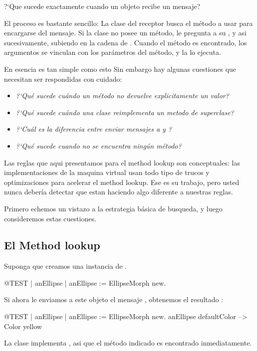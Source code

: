 \documentclass[a4paper,10pt,twoside]{book}
\begin{document}

?`Que sucede exactamente cuando un objeto recibe un mensaje?

El proceso es bastante sencillo:
La clase del receptor busca el m\'etodo a usar para encargarse del mensaje.
Si la clase no posee un m\'etodo, le pregunta a su , y asi sucesivamente, subiendo en la cadena de .
Cuando el m\'etodo es encontrado, los argumentos se vinculan con los par\'ametros del m\'etodo, y la  lo ejecuta.

En esencia es tan simple como esto
Sin embargo hay algunas cuestiones que necesitan ser respondidas con cuidado:

\begin{itemize}
  \item \emph{?`Qu\'e sucede cu\'ando un m\'etodo no devuelve explicitamente un valor?}
  \item \emph{?`Qu\'e sucede cu\'ando una clase reimplementa un metodo de superclase?}
  \item \emph{?`Cu\'al es la diferencia entre enviar mensajes a  y ?}
  \item \emph{?`Qu\'e sucede cuando no se encuentra ning\'un m\'etodo?}
\end{itemize}

Las reglas que aqui presentamos para el method lookup son conceptuales: las implementaciones de la maquina virtual usan todo tipo de trucos y optimizaciones para acelerar el method lookup. 
Ese es su trabajo, pero usted nunca deber\'ia detectar que estan haciendo algo diferente a nuestras reglas.

Primero echemos un vistazo a la estrategia b\'asica de busqueda, y luego consideremos estas cuestiones.

\subsection{El Method lookup}
Suponga que creamos una instancia de .
\begin{code}{@TEST | anEllipse |}
anEllipse := EllipseMorph new.
\end{code}
\noindent
Si ahora le enviamos a este objeto el mensaje , obtenemos el resultado :
\begin{code}{@TEST | anEllipse | anEllipse := EllipseMorph new.}
anEllipse defaultColor --> Color yellow
\end{code}
\noindent
La clase  implementa , asi que el m\'etodo indicado es encontrado inmediatamente.
\end{document}
